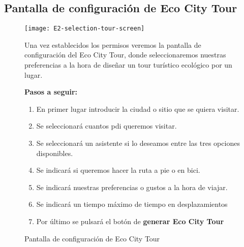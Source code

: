 \subsection{Pantalla de configuración de Eco City Tour}
\begin{figure}[H]
	\centering
		\texttt{[image: E2-selection-tour-screen]} 	
		\label{fig:selectionTourScreen}
		\caption{Pantalla de configuración de Eco City Tour}
		
	\begin{flushleft}
		Una vez establecidos los permisos veremos la pantalla de configuración del Eco City Tour, donde seleccionaremos nuestras preferencias a la hora de diseñar un tour turístico ecológico por un lugar.
	\end{flushleft}
		\textbf{Pasos a seguir:}
		\begin{enumerate}
			\item En primer lugar introducir la ciudad o sitio que se quiera visitar. 
			\item Se seleccionará cuantos \acrlong{pdi} queremos visitar.
			\item Se seleccionará un asistente si lo deseamos entre las tres opciones disponibles.
			\item Se indicará si queremos hacer la ruta a pie o en bici.
			\item Se indicará nuestras preferencias o gustos a la hora de viajar.
			\item Se indicará un tiempo máximo de tiempo en desplazamientos
			\item Por último se pulsará el botón de \textbf{generar Eco City Tour}
		\end{enumerate}		
	


\end{figure}
\newpage
